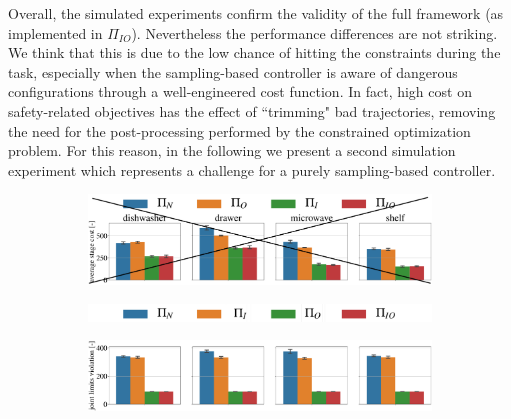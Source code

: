 Overall, the simulated experiments confirm the validity of the full framework (as implemented in $\Pi_{IO}$). Nevertheless the performance differences are not striking. We think that this is due to the low chance of hitting the constraints during the task, especially when the sampling-based controller is aware of dangerous configurations through a well-engineered cost function. In fact, high cost on safety-related objectives has the effect of ``trimming" bad trajectories, removing the need for the post-processing performed by the constrained optimization problem. For this reason, in the following we present a second simulation experiment which represents a challenge for a purely sampling-based controller. 

\begin{figure}[t]
\centering
\hspace*{-0.2cm}
\vspace*{0.15cm}
\begin{subfigure}{1\columnwidth}
    \includegraphics[width=\linewidth]{figures/methods_comparison/average_stage_cost_sout.pdf}
\end{subfigure}%
\hfill
\begin{subfigure}{1\columnwidth}
    \includegraphics[width=\linewidth]{figures/methods_comparison/legend.pdf}
\end{subfigure}%
\hfill
\hspace*{-0.2cm}
\vspace*{0.1cm}
\begin{subfigure}{\columnwidth}
    \includegraphics[width=\linewidth]{figures/methods_comparison/joint_limits.pdf}
\end{subfigure}%
\hfill
\hspace*{-0.2cm}

\end{figure}
